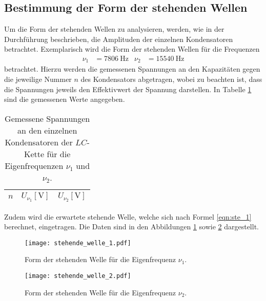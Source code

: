 \subsection{Bestimmung der Form der stehenden Wellen}
Um die Form der stehenden Wellen zu analysieren, werden, wie in der Durchführung beschrieben, die Amplituden der einzelnen Kondensatoren betrachtet.
Exemplarisch wird die Form der stehenden Wellen für die Frequenzen
\begin{align*}
  \nu_1 &= \SI{7806}{\hertz} & \nu_2 &= \SI{15540}{\hertz}
\end{align*}
betrachtet.
Hierzu werden die gemessenen Spannungen an den Kapazitäten gegen die jeweilige Nummer $n$ des Kondensators abgetragen, wobei zu beachten ist, dass die Spannungen jeweils den Effektivwert der Spannung darstellen.
In Tabelle \ref{tab:stehend1} sind die gemessenen Werte angegeben.
\begin{table}
  \centering
  \caption{Gemessene Spannungen an den einzelnen Kondensatoren der $LC$-Kette für die Eigenfrequenzen $\nu_1$ und $\nu_2$.}
  \label{tab:stehend1}
  \begin{tabular}{c c c}
    \toprule
    {$n$} & {$U_{\nu_1} [\si{\volt}]$} & {$U_{\nu_2} [\si{\volt}]$}\\
    \midrule
    
    \bottomrule
  \end{tabular}
\end{table}

Zudem wird die erwartete stehende Welle, welche sich nach Formel \ref{eqn:ste_1} berechnet, eingetragen.
Die Daten sind in den Abbildungen \ref{fig:stehend1} sowie \ref{fig:stehend2} dargestellt.

\begin{figure}[H]
  \centering
  \texttt{[image: stehende\_welle\_1.pdf]}
  \caption{Form der stehenden Welle für die Eigenfrequenz $\nu_1$.}
  \label{fig:stehend1}
\end{figure}

\begin{figure}[H]
  \centering
  \texttt{[image: stehende\_welle\_2.pdf]}
  \caption{Form der stehenden Welle für die Eigenfrequenz $\nu_2$.}
  \label{fig:stehend2}
\end{figure}

